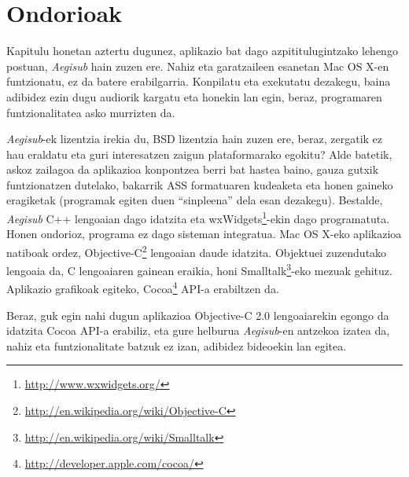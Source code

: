 \section{Ondorioak}

Kapitulu honetan aztertu dugunez, aplikazio bat dago azpititulugintzako lehengo postuan, \textit{Aegisub} hain zuzen ere. Nahiz eta garatzaileen esanetan Mac OS X-en funtzionatu, ez da batere erabilgarria. Konpilatu eta exekutatu dezakegu, baina adibidez ezin dugu audiorik kargatu eta honekin lan egin, beraz, programaren funtzionalitatea asko murrizten da.

\textit{Aegisub}-ek lizentzia irekia du, BSD lizentzia hain zuzen ere, beraz, zergatik ez hau eraldatu eta guri interesatzen zaigun plataformarako egokitu? Alde batetik, askoz zailagoa da aplikazioa konpontzea berri bat hastea baino, gauza gutxik funtzionatzen dutelako, bakarrik ASS formatuaren kudeaketa eta honen gaineko eragiketak (programak egiten duen ``sinpleena'' dela esan dezakegu). Bestalde, \textit{Aegisub} C++ lengoaian dago idatzita eta wxWidgets\footnote{\url{http://www.wxwidgets.org/}}-ekin dago programatuta. Honen ondorioz, programa ez dago sisteman integratua.
Mac OS X-eko aplikazioa natiboak ordez, Objective-C\footnote{\url{http://en.wikipedia.org/wiki/Objective-C}} lengoaian daude idatzita. Objektuei zuzendutako lengoaia da, C lengoaiaren gainean eraikia, honi Smalltalk\footnote{\url{http://en.wikipedia.org/wiki/Smalltalk}}-eko mezuak gehituz. Aplikazio grafikoak egiteko, Cocoa\footnote{\url{http://developer.apple.com/cocoa/}} API-a erabiltzen da.

Beraz, guk egin nahi dugun aplikazioa Objective-C 2.0 lengoaiarekin egongo da idatzita Cocoa API-a erabiliz, eta gure helburua \textit{Aegisub}-en antzekoa izatea da, nahiz eta funtzionalitate batzuk ez izan, adibidez bideoekin lan egitea.